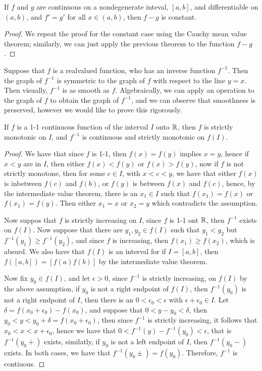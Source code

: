 \begin{remark}
    If $f$ and  $g$ are continuous on a nondegenerate inteval,  $[a,b]$, and differentiable 
    on  $(a,b)$, and  $f'=g'$ for all  $x \in (a,b)$, then $f-g$ is constant.
\end{remark}
\begin{proof}
    We repeat the proof for the constant case using the Cauchy mean value theorem; 
    similarly, we can just apply the previous theorem to the function $f-g$.
\end{proof}

Suppose that $f$ is a realvalued function, who has an inverse function  $f^{-1}$. Then 
the graph of  $f^{-1}$ is symmetric to the graph of  $f$ with respect to the line  $y=x$. Then 
visually,  $f^{-1}$ is as smooth as  $f$. Algebraically, we can apply an operation to the graph 
of $f$ to obtain the graph of  $f^{-1}$, and we can observe that smoothness is preserved, however 
we would like to prove this rigorously.

\begin{theorem}\label{4.4.2}
    If $f$ is a  1-1 continuous function of the interval  $I$ onto $\mathbb{R}$, 
    then  $f$ is strictly monotonic on  $I$, and  $f^{-1}$ is continuous and strictly 
    monotonic on $f(I)$.
\end{theorem}
\begin{proof}
    We have that since $f$ is 1-1, then  $f(x)=f(y)$ implies  $x=y$, hence if  $x<y$ 
    are in $I$, then  either $f(x)<f(y)$ or  $f(x)>f(y)$, now if  $f$ is not strictly monotone, then 
    for some $c \in I$, with  $x<c<y$, we have that either  $f(x)$ is inbetween $f(c)$ and  $f(b)$, 
    or  $f(y)$ is between  $f(x)$ and  $f(c)$, hence, by the intermediate value theorem, there is an  $x_1 \in I$ 
    such that $f(x_1)=f(x)$ or $f(x_1)=f(y)$. Then either $x_1=x$ or $x_2=y$ which contradicts the assumption.

    Now suppos that $f$ is strictly increasing on  $I$, since  $f$ is 1-1 ont  $\mathbb{R}$, then 
    $f^{-1}$ exists on  $f(I)$. Now suppose that there are  $y_1,y_2 \in f(I)$ such that 
    $ y_1<y_2$ but $f^{-1}(y_1) \geq f^{-1}(y_2)$, and since $f$ is increasing, then  $f(x_1) \geq f(x_2)$, which 
    is absurd. We also have that $f(I)$ is an interval for if  $I=[a,b]$, then  $f([a,b])=[f(a)f(b)]$ by 
    the intermediate value theorem.

    Now fix  $y_0 \in f(I)$, and let $\epsilon>0$, since $f^{-1}$ is strictly increasing, on $f(I)$ by 
    the above assumption, if $y_0$ is not a right endpoint of $f(I)$, then  $f^{-1}(y_0)$ is not 
    a  right endpoint of  $I$, then  there is an $0<\epsilon_0<\epsilon$ with $\epsilon+\epsilon_0 \in I$. Let  $\delta=f(x_0+\epsilon_0)-f(x_0)$, 
    and suppose that $0<y-y_0<\delta$, then $y_0<y<y_0+\delta=f(x_0+\epsilon_0)$, then since $f^{-1}$ is strictly 
    increasing, it follows that  $x_0<x<x+\epsilon_0$, hence we have that $0<f^{-1}(y)-f^{-1}(y_0)<\epsilon$, 
    that is $f^{-1}(y_0+)$ exists, similatly, if $y_0$ is not a left endpoint of $I$, then  $f^{-1}(y_0-)$ 
    exists. In both cases, we have that $f^{-1}(y_0\pm)=f(y_0)$. Therefore, $f^{-1}$ is contiuous.
\end{proof}
